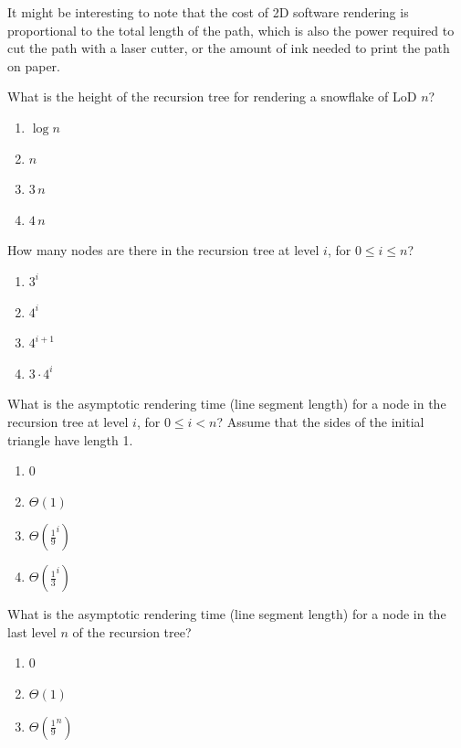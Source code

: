 \documentclass[12pt,twoside]{article}
\begin{document}
\begin{problems}
It might be interesting to note that the cost of 2D software rendering is
proportional to the total length of the path, which is also the power required
to cut the path with a laser cutter, or the amount of ink needed to print the
path on paper.

\begin{problemparts}
  \problempart {} What is the height of the recursion tree for rendering
  a snowflake of LoD $n$?
    \begin{enumerate}
      \item $\log n$
      \item $n$
      \item $3 \, n$
      \item $4 \, n$
    \end{enumerate}
  \problempart {} How many nodes are there in the recursion tree at
  level $i$, for $0 \le i \le n$?
    \begin{enumerate}
      \item $3 ^ i$
      \item $4 ^ i$
      \item $4 ^ {i + 1}$
      \item $3 \cdot 4 ^ i$
    \end{enumerate}
  \problempart {} What is the asymptotic rendering time (line segment
  length) for a node in the recursion tree at level $i$, for $0 \le i < n$?
  Assume that the sides of the initial triangle have length 1.
    \begin{enumerate}
      \item $0$
      \item $\Theta(1)$
      \item $\Theta(\frac{1}{9}^i)$
      \item $\Theta(\frac{1}{3}^i)$
    \end{enumerate}
  \problempart {} What is the asymptotic rendering time (line segment
  length) for a node in the last level $n$ of the recursion tree?
    \begin{enumerate}
      \item $0$
      \item $\Theta(1)$
      \item $\Theta(\frac{1}{9}^n)$

\end{enumerate}
\end{problemparts}
\end{problems}
\end{document}
